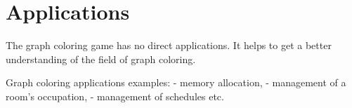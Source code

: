\section{Applications}

The graph coloring game has no direct applications. It helps to get a better understanding of the field of graph coloring.


Graph coloring applications examples: 
- memory allocation,
- management of a room's occupation, 
- management of schedules etc.


